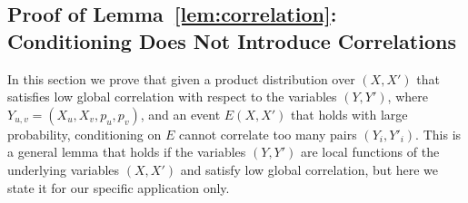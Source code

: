 


\subsection{Proof of Lemma~\ref{lem:correlation}: 
Conditioning Does Not Introduce Correlations}

In this section we prove that given a product distribution over $(X,X')$ that satisfies low global correlation with respect to the variables $(Y,Y')$, where $Y_{u,v} = (X_u,X_v,p_u,p_v)$, and an event $E(X,X')$ that holds with large probability, conditioning on $E$ cannot correlate too many pairs $(Y_i,Y'_i)$. This is a general lemma that holds if the variables $(Y,Y')$ are local functions of the underlying variables $(X,X')$ and satisfy low global correlation, but here we state it for our specific application only. 


